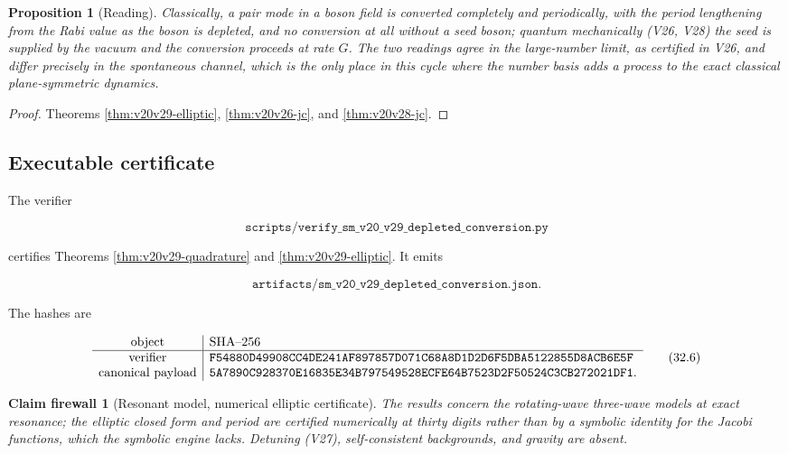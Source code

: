 \documentclass[11pt]{article}
\newtheorem{proposition}[theorem]{Proposition}
\newtheorem{firewall}[theorem]{Claim firewall}
\theoremstyle{remark}
\begin{document}
\begin{proposition}[Reading]
\label{prop:v20v29-reading}
Classically, a pair mode in a boson field is converted completely
and periodically, with the period lengthening from the Rabi value
as the boson is depleted, and no conversion at all without a seed
boson; quantum mechanically (V26, V28) the seed is supplied by the
vacuum and the conversion proceeds at rate \(G\).  The two readings
agree in the large-number limit, as certified in V26, and differ
precisely in the spontaneous channel, which is the only place in
this cycle where the number basis adds a process to the exact
classical plane-symmetric dynamics.
\end{proposition}

\begin{proof}
Theorems \ref{thm:v20v29-elliptic}, \ref{thm:v20v26-jc}, and
\ref{thm:v20v28-jc}.
\end{proof}

\subsection{Executable certificate}

The verifier

\[
 \texttt{scripts/verify\_sm\_v20\_v29\_depleted\_conversion.py}       \tag{32.4}
\]

certifies Theorems \ref{thm:v20v29-quadrature} and
\ref{thm:v20v29-elliptic}.  It emits

\[
 \texttt{artifacts/sm\_v20\_v29\_depleted\_conversion.json}.          \tag{32.5}
\]

The hashes are

\[
\begin{array}{c|l}
\hbox{object}&\hbox{SHA--256}\\ \hline
\hbox{verifier}&
\texttt{F54880D49908CC4DE241AF897857D071C68A8D1D2D6F5DBA5122855D8ACB6E5F}\\
\hbox{canonical payload}&
\texttt{5A7890C928370E16835E34B797549528ECFE64B7523D2F50524C3CB272021DF1}.
\end{array}                                                     \tag{32.6}
\]

\begin{firewall}[Resonant model, numerical elliptic certificate]
\label{fire:v20v29}
The results concern the rotating-wave three-wave models at exact
resonance; the elliptic closed form and period are certified
numerically at thirty digits rather than by a symbolic identity for
the Jacobi functions, which the symbolic engine lacks.  Detuning
(V27), self-consistent backgrounds, and gravity are absent.
\end{firewall}
\end{document}
